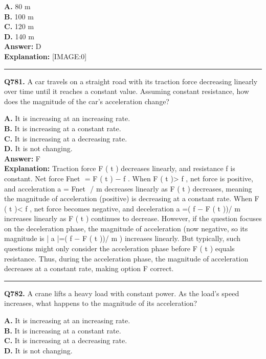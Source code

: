 \documentclass[12pt]{article}
\begin{document}
\textbf{A.} 80 m \\
\textbf{B.} 100 m \\
\textbf{C.} 120 m \\
\textbf{D.} 140 m \\

\textbf{Answer:} D \\
\textbf{Explanation:} [IMAGE:0]

\hrule
\vspace{1em}


\noindent
\textbf{Q781.} A car travels on a straight road with its traction force decreasing linearly over time until it reaches a constant value. Assuming constant resistance, how does the magnitude of the car’s acceleration change?



\textbf{A.} It is increasing at an increasing rate. \\
\textbf{B.} It is increasing at a constant rate. \\
\textbf{C.} It is increasing at a decreasing rate. \\
\textbf{D.} It is not changing. \\

\textbf{Answer:} F \\
\textbf{Explanation:} Traction force
F
(
t
) decreases linearly, and resistance
f
is constant. Net force
Fnet
​
=
F
(
t
)
−
f
. When
F
(
t
)>
f
, net force is positive, and acceleration
a
=
Fnet
​
/
m
decreases linearly as
F
(
t
) decreases, meaning the magnitude of acceleration (positive) is decreasing at a constant rate. When
F
(
t
)<
f
, net force becomes negative, and deceleration
a
=(
f
−
F
(
t
))/
m
increases linearly as
F
(
t
) continues to decrease. However, if the question focuses on the deceleration phase, the magnitude of acceleration (now negative, so its magnitude is |
a
|=(
f
−
F
(
t
))/
m
) increases linearly. But typically, such questions might only consider the acceleration phase before
F
(
t
) equals resistance. Thus, during the acceleration phase, the magnitude of acceleration decreases at a constant rate, making option F correct.

\hrule
\vspace{1em}


\noindent
\textbf{Q782.} A crane lifts a heavy load with constant power. As the load’s speed increases, what happens to the magnitude of its acceleration?



\textbf{A.} It is increasing at an increasing rate. \\
\textbf{B.} It is increasing at a constant rate. \\
\textbf{C.} It is increasing at a decreasing rate. \\
\textbf{D.} It is not changing. \\
\end{document}
